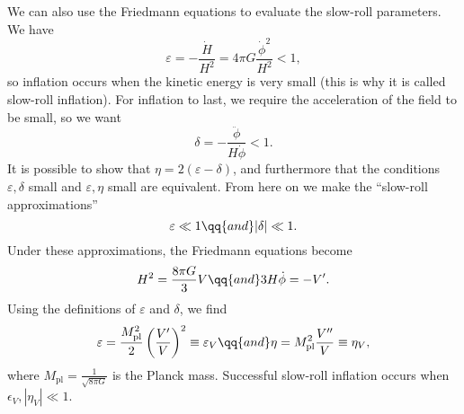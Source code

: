 \documentclass{jknotes}
\begin{document}
We can also use the Friedmann equations to evaluate the slow-roll parameters. We have
\begin{equation}
    \varepsilon = -\frac{\dot{H}}{H^2} = 4\pi G \frac{\dot\phi^2}{H^2} < 1,
\end{equation}
so inflation occurs when the kinetic energy is very small (this is why it is called slow-roll inflation). For inflation to last, we require the acceleration of the field to be small, so we want
\begin{equation}
    \delta = -\frac{\ddot\phi}{H\dot\phi}<1.
\end{equation}
It is possible to show that \(\eta = 2(\varepsilon - \delta)\), and furthermore that the conditions \(\varepsilon,\delta\) small and \(\varepsilon,\eta\) small are equivalent. From here on we make the ``slow-roll approximations''
\begin{equation}
    \varepsilon \ll 1 \qq{and} |\delta| \ll 1.
\end{equation}
Under these approximations, the Friedmann equations become
\begin{equation}
    H^2 = \frac{8\pi G}3 V \qq{and} 3H\dot\phi=-V'.
\end{equation}
Using the definitions of \(\varepsilon\) and \(\delta\), we find
\begin{equation}
    \varepsilon = \frac{M_{\text{pl}}^2}2 \left(\frac{V'}V\right)^2 \equiv \varepsilon_{V}
    \qq{and}
    \eta = M_{\text{pl}}^2 \frac{V''}V \equiv \eta_{V},
\end{equation}
where \(M_{\text{pl}} = \frac1{\sqrt{8\pi G}}\) is the Planck mass. Successful slow-roll inflation occurs when \(\epsilon_{V},|\eta_{V}|\ll 1\).
\end{document}
